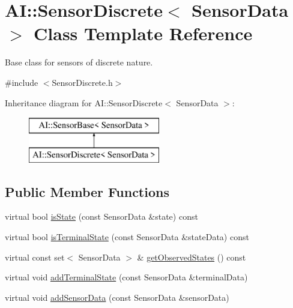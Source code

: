\hypertarget{classAI_1_1SensorDiscrete}{\section{A\-I\-:\-:Sensor\-Discrete$<$ Sensor\-Data $>$ Class Template Reference}
\label{classAI_1_1SensorDiscrete}
}


Base class for sensors of discrete nature.  




{\ttfamily \#include $<$Sensor\-Discrete.\-h$>$}

Inheritance diagram for A\-I\-:\-:Sensor\-Discrete$<$ Sensor\-Data $>$\-:\begin{figure}[H]
\begin{center}
\leavevmode
\includegraphics[height=2.000000cm]{classAI_1_1SensorDiscrete}
\end{center}
\end{figure}
\subsection*{Public Member Functions}
\begin{DoxyCompactItemize}
\item 
virtual bool \hyperlink{classAI_1_1SensorDiscrete_a267487b20eebad42f7fcb7ee5119ac21}{is\-State} (const Sensor\-Data \&state) const 
\item 
virtual bool \hyperlink{classAI_1_1SensorDiscrete_a1d97411a1eff0ecb1a2ee054f06bfc2c}{is\-Terminal\-State} (const Sensor\-Data \&state\-Data) const 
\item 
virtual const set$<$ Sensor\-Data $>$ \& \hyperlink{classAI_1_1SensorDiscrete_ab91abf49a2e0ad5592c6c0e7ac67eb5b}{get\-Observed\-States} () const 
\item 
virtual void \hyperlink{classAI_1_1SensorDiscrete_aec690a03f58beb1755b70de98df7e0a2}{add\-Terminal\-State} (const Sensor\-Data \&terminal\-Data)
\item 
virtual void \hyperlink{classAI_1_1SensorDiscrete_a9837a3640a687ea37d5f9900c3dcbcbc}{add\-Sensor\-Data} (const Sensor\-Data \&sensor\-Data)
\end{DoxyCompactItemize}


